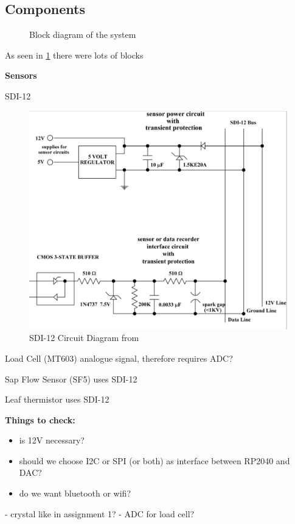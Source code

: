 \subsection{Components}


\begin{figure}
    \begin{center}
    
    \end{center}
    \caption{Block diagram of the system}
    \label{block_diagram}
\end{figure}

As seen in \cref{block_diagram} there were lots of blocks


\textbf{Sensors}

SDI-12

\begin{figure}
    \includegraphics[width=\linewidth]{figures/SDI-12 circuit.png}
    \caption{SDI-12 Circuit Diagram from \cite{sdi12_datasheet}}
    \label{sdi12_circuit}
\end{figure}

Load Cell (MT603)
analogue signal, therefore requires ADC?

Sap Flow Sensor (SF5)
uses SDI-12

Leaf thermistor
uses SDI-12

\textbf{Things to check:}
\begin{itemize}
    \item is 12V necessary?
    \item should we choose I2C or SPI (or both) as interface between RP2040 and DAC?
    \item do we want bluetooth or wifi?
  \end{itemize}
- crystal like in assignment 1?
- ADC for load cell?
